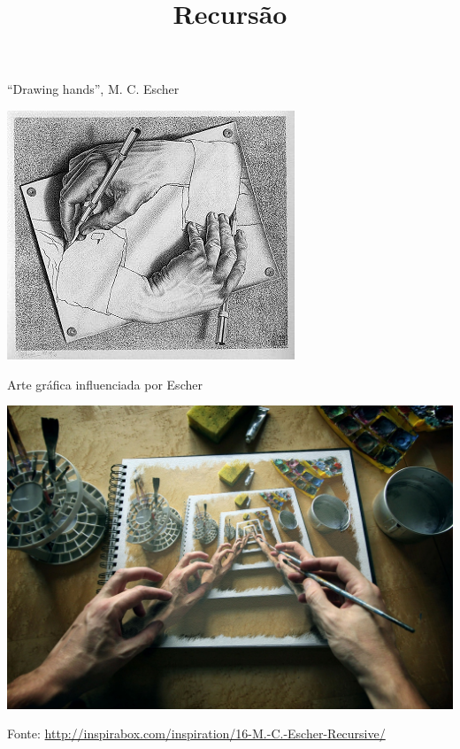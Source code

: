 \lstset{basicstyle=\normalsize}

\title{Recursão}
\frame{\maketitle}

\begin{frame}{``Drawing hands'', M. C. Escher}
\begin{center}
  \includegraphics[scale=.725]{img/drawingHands-escher.png}
\end{center}
\end{frame}

\begin{frame}{Arte gráfica influenciada por Escher}
\begin{center}
  \includegraphics[scale=.2]{img/recursive-escher.png}
\end{center}
{\vfill\tiny Fonte: \url{http://inspirabox.com/inspiration/16-M.-C.-Escher-Recursive/}}
\end{frame}

